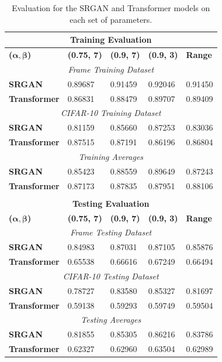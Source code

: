 \documentclass[letterpaper]{article} %
\begin{document}
\begin{table}[t]
\begin{centering}
\bgroup
\def\arraystretch{1.5}
\begin{tabular}{| m{} | m{} | m{} | m{} | m{}|} 
\hline
\multicolumn{5}{|c|}{\textbf{Training Evaluation}} \\
\hline
\hline
\textbf{($\boldsymbol{\alpha},\boldsymbol{\beta}$)} & \textbf{(0.75, 7)} & \textbf{(0.9, 7)} & \textbf{(0.9, 3)} & \textbf{Range} \\ 
\hline
\multicolumn{5}{|c|}{\textit{Frame Training Dataset}} \\
\hline
\textbf{SRGAN} & 0.89687 & 0.91459 & 0.92046 & 0.91450 \\
\hline
\textbf{Transformer} & 0.86831 & 0.88479 & 0.89707 & 0.89409 \\
\hline
\multicolumn{5}{|c|}{\textit{CIFAR-10 Training Dataset}} \\
\hline
\textbf{SRGAN} & 0.81159 & 0.85660 & 0.87253 & 0.83036 \\
\hline
\textbf{Transformer} & 0.87515 & 0.87191 & 0.86196 & 0.86804 \\
\hline
\multicolumn{5}{|c|}{\textit{Training Averages}} \\
\hline
\textbf{SRGAN} & 0.85423 & 0.88559 & 0.89649 & 0.87243 \\
\hline
\textbf{Transformer} & 0.87173 & 0.87835 & 0.87951 & 0.88106 \\
\hline
\multicolumn{5}{c}{} \\
\hline
\multicolumn{5}{|c|}{\textbf{Testing Evaluation}} \\
\hline
\hline
\textbf{($\boldsymbol{\alpha},\boldsymbol{\beta}$)} & \textbf{(0.75, 7)} & \textbf{(0.9, 7)} & \textbf{(0.9, 3)} & \textbf{Range} \\ 
\hline
\multicolumn{5}{|c|}{\textit{Frame Testing Dataset}} \\
\hline
\textbf{SRGAN} & 0.84983 & 0.87031 & 0.87105 & 0.85876 \\
\hline
\textbf{Transformer} & 0.65538 & 0.66616 & 0.67249 & 0.66494 \\
\hline
\multicolumn{5}{|c|}{\textit{CIFAR-10 Testing Dataset}} \\
\hline
\textbf{SRGAN} & 0.78727 & 0.83580 & 0.85327 & 0.81697 \\
\hline
\textbf{Transformer} & 0.59138 & 0.59293 & 0.59749 & 0.59504 \\
\hline
\multicolumn{5}{|c|}{\textit{Testing Averages}} \\
\hline
\textbf{SRGAN} & 0.81855 & 0.85305 & 0.86216 & 0.83786 \\
\hline
\textbf{Transformer} & 0.62327 & 0.62960 & 0.63504 & 0.62989 \\
\hline
\end{tabular}
\bigskip
\caption{Evaluation for the SRGAN and Transformer models on each set of parameters.}
\label{tbl:results}
\egroup
\end{centering}
\end{table}
\end{document}
